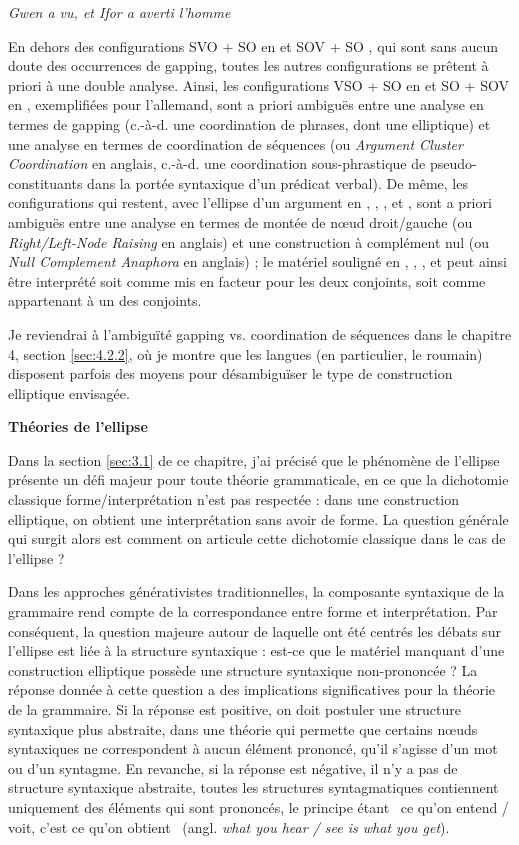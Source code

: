 {\itshape
Gwen a vu, et Ifor a averti l'homme}

En dehors des configurations SVO + SO en  et SOV + SO , qui sont sans aucun doute des occurrences de gapping, toutes les autres configurations se prêtent à priori à une double analyse. Ainsi, les configurations VSO + SO en  et SO + SOV en , exemplifiées pour l'allemand, sont a priori ambiguës entre une analyse en termes de gapping (c.-à-d. une coordination de phrases, dont une elliptique) et une analyse en termes de coordination de séquences (ou \textit{Argument Cluster Coordination} en anglais, c.-à-d. une coordination sous-phrastique de pseudo-constituants dans la portée syntaxique d'un prédicat verbal). De même, les configurations qui restent, avec l'ellipse d'un argument en , , ,  et , sont a priori ambiguës entre une analyse en termes de montée de n{\oe}ud droit/gauche (ou \textit{Right/Left-Node Raising} en anglais) et une construction à complément nul (ou \textit{Null Complement Anaphora} en anglais) ; le matériel souligné en , , ,  et  peut ainsi être interprété soit comme mis en facteur pour les deux conjoints, soit comme appartenant à un des conjoints.~

Je reviendrai à l'ambiguïté gapping vs. coordination de séquences dans le chapitre 4, section \ref{sec:4.2.2}, où je montre que les langues (en particulier, le roumain) disposent parfois des moyens pour désambiguïser le type de construction elliptique envisagée.

{\bfseries
Théories de l'ellipse~}

Dans la section \ref{sec:3.1} de ce chapitre, j'ai précisé que le phénomène de l'ellipse présente un défi majeur pour toute théorie grammaticale, en ce que la dichotomie classique forme/interprétation n'est pas respectée : dans une construction elliptique, on obtient une interprétation sans avoir de forme. La question générale qui surgit alors est comment on articule cette dichotomie classique dans le cas de l'ellipse ? 

Dans les approches générativistes traditionnelles, la composante syntaxique de la grammaire rend compte de la correspondance entre forme et interprétation. Par conséquent, la question majeure autour de laquelle ont été centrés les débats sur l'ellipse est liée à la structure syntaxique : est-ce que le matériel manquant d'une construction elliptique possède une structure syntaxique non-prononcée ? La réponse donnée à cette question a des implications significatives pour la théorie de la grammaire. Si la réponse est positive, on doit postuler une structure syntaxique plus abstraite, dans une théorie qui permette que certains n{\oe}uds syntaxiques ne correspondent à aucun élément prononcé, qu'il s'agisse d'un mot ou d'un syntagme. En revanche, si la réponse est négative, il n'y a pas de structure syntaxique abstraite, toutes les structures syntagmatiques contiennent uniquement des éléments qui sont prononcés, le principe étant {\guillemotleft}~ce qu'on entend / voit, c'est ce qu'on obtient~{\guillemotright} (angl. \textit{what you hear / see is what you get}). 

